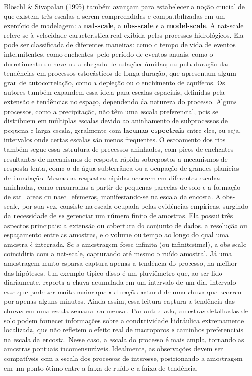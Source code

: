 \documentclass[./main.tex]{subfiles}
\begin{document}
\par Blöschl \& Sivapalan (1995) também avançam para estabelecer a noção crucial de que existem três escalas a serem compreendidas e compatibilizadas em um exercício de modelagem: a \textbf{\gls{nat-scale}}, a \textbf{\gls{obs-scale}} e a \textbf{\gls{model-scale}}. A \gls{nat-scale} refere-se à velocidade característica real exibida pelos processos hidrológicos. Ela pode ser classificada de diferentes maneiras: como o tempo de vida de eventos intermitentes, como enchentes; pelo período de eventos anuais, como o derretimento de neve ou a chegada de estações úmidas; ou pela duração das tendências em processos estocásticos de longa duração, que apresentam algum grau de autocorrelação, como a depleção ou o enchimento de aquíferos. Os autores também expandem essa ideia para escalas espaciais, definidas pela extensão e tendências no espaço, dependendo da natureza do processo. Alguns processos, como a precipitação, não têm uma escala preferencial, pois se distribuem em múltiplas escalas devido ao aninhamento de subprocessos de pequena e larga escala, geralmente com \textbf{lacunas espectrais} entre eles, ou seja, intervalos onde certas escalas são menos frequentes. O escoamento dos rios também segue essa estrutura de processos aninhados, com picos de enchentes resultantes de mecanismos de resposta rápida sobrepostos a mecanismos de resposta lenta, como o da água subterrânea ou a ocupação de grandes planícies de inundação. Mesmo as respostas rápidas ocorrem em diferentes escalas aninhadas, como enxurradas a partir de pequenas parcelas de solo e a formação de \gls{sat_areas} ou \gls{nasc_efemeras}, manifestando-se na escala da encosta. A \gls{obs-scale}, por sua vez, consiste na escala ocupada pelas evidências empíricas, surgindo da necessidade de se gerenciar um número finito de amostras. Ela possui três aspectos principais: a extensão ou cobertura do conjunto de dados, a resolução ou espaçamento entre as amostras, e o volume ou tempo ao longo do qual uma amostra é integrada. Se a amostragem fosse infinita (ou infinitesimal), a \gls{obs-scale} coincidiria com a \gls{nat-scale}, capturando até mesmo o ruído amostral. Já uma amostragem muito esparsa captura apenas a tendência do processo, na melhor das hipóteses. Um exemplo típico disso é um pluviômetro que, ao ser lido diariamente, reporta a chuva acumulada em um intervalo de um dia, intervalo esse que pode ser muito maior que a duração natural de uma chuva que ocorreu por apenas alguns minutos. Ainda assim, essa leitura captura a tendência das chuvas em uma escala semanal ou mensal. Por outro lado, amostras detalhadas de solo podem fornecer informações sobre a condutividade hidráulica extremamente localizada, que não refletem o efeito real de macroporos e caminhos preferenciais na escala da encosta. Nesse caso, a escala do processo é mais ampla, tornando as amostras pontuais incomensuráveis. Idealmente, as observações devem ser compatíveis com a escala dos processos de interesse, posicionando a amostragem em um ponto ótimo entre a faixa de ruído e a faixa de tendência. 
\end{document}
